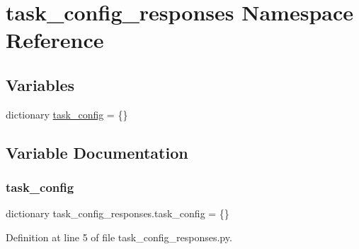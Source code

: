 \hypertarget{namespacetask__config__responses}{}\section{task\+\_\+config\+\_\+responses Namespace Reference}
\label{namespacetask__config__responses}
\subsection*{Variables}
\begin{DoxyCompactItemize}
\item 
dictionary \hyperlink{namespacetask__config__responses_a7f78cceda910c9fa46d26e81a5e6f285}{task\+\_\+config} = \{\}
\end{DoxyCompactItemize}


\subsection{Variable Documentation}
\mbox{\label{namespacetask__config__responses_a7f78cceda910c9fa46d26e81a5e6f285}} 
\subsubsection{\texorpdfstring{task\+\_\+config}{task\_config}}
{\footnotesize\ttfamily dictionary task\+\_\+config\+\_\+responses.\+task\+\_\+config = \{\}}



Definition at line 5 of file task\+\_\+config\+\_\+responses.\+py.

